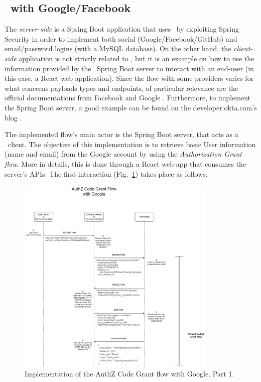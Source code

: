\subsection{\oauth\ with Google/Facebook}
The \textit{server-side} is a Spring Boot application that uses \oauth\ by exploiting Spring Security in order to implement both social (Google/Facebook/GitHub) and email/password logins (with a MySQL database). On the other hand, the \textit{client-side} application is not strictly related to \oauth, but it is an example on how to use the information provided by the \oauth\ Spring Boot server to interact with an end-user (in this case, a React web application). Since the flow with some providers varies for what concerns payloads types and endpoints, of particular relevance are the official documentations from Facebook \cite{facebook} and Google \cite{google1, google2}. Furthermore, to implement the Spring Boot server, a good example can be found on the developer.okta.com's blog \cite{sprboot}. 

The implemented flow's main actor is the Spring Boot server, that acts as a \oauth\ client. The objective of this implementation is to retrieve basic User information (name and email) from the Google account by using the \textit{Authorization Grant flow}. More in details, this is done through a React web-app that consumes the server's APIs. The first interaction (Fig.~\ref{fig:google1}) takes place as follows:

\begin{figure}[h]
    \centering
    \includegraphics[width=0.85\textwidth]{chapters/images/chp6/flow_google1.png}
    \caption{Implementation of the AuthZ Code Grant flow with Google. Part 1.}
    \label{fig:google1}
\end{figure}

